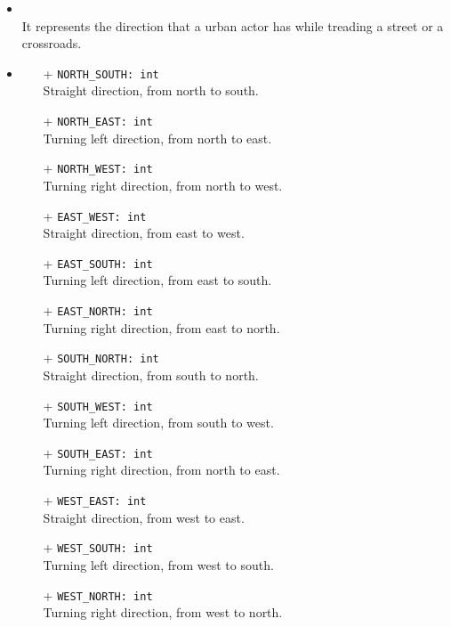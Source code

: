 \begin{itemize}
  \item \textbf{\descr} \\
    It represents the direction that a urban actor has while treading a
    street or a crossroads.
  \item \textbf{}
  \begin{itemize}
    \item[+] \texttt{NORTH\_SOUTH: int} \\
    Straight direction, from north to south.
    \item[+] \texttt{NORTH\_EAST: int} \\
    Turning left direction, from north to east.
    \item[+] \texttt{NORTH\_WEST: int} \\
    Turning right direction, from north to west.
    \item[+] \texttt{EAST\_WEST: int} \\
    Straight direction, from east to west.
    \item[+] \texttt{EAST\_SOUTH: int} \\
    Turning left direction, from east to south.
    \item[+] \texttt{EAST\_NORTH: int} \\
    Turning right direction, from east to north.
    \item[+] \texttt{SOUTH\_NORTH: int} \\
    Straight direction, from south to north.
    \item[+] \texttt{SOUTH\_WEST: int} \\
    Turning left direction, from south to west.
    \item[+] \texttt{SOUTH\_EAST: int} \\
    Turning right direction, from north to east.
    \item[+] \texttt{WEST\_EAST: int} \\
    Straight direction, from west to east.
    \item[+] \texttt{WEST\_SOUTH: int} \\
    Turning left direction, from west to south.
    \item[+] \texttt{WEST\_NORTH: int} \\
    Turning right direction, from west to north.
  \end{itemize}
\end{itemize}